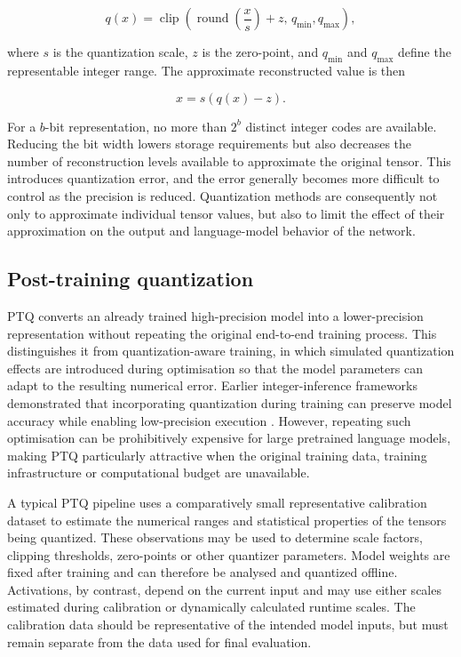 \begin{equation}
q(x)
=
\operatorname{clip}
\left(
\operatorname{round}
\left(
\frac{x}{s}
\right)
+z,\,
q_{\min},q_{\max}
\right),
\label{eq:uniform-quantization}
\end{equation}

where \(s\) is the quantization scale, \(z\) is the zero-point, and \(q_{\min}\) and \(q_{\max}\) define the representable integer range. The approximate reconstructed value is then

\begin{equation}
\hat{x}
=
s\left(q(x)-z\right).
\label{eq:uniform-dequantization}
\end{equation}

For a \(b\)-bit representation, no more than \(2^b\) distinct integer codes are available. Reducing the bit width lowers storage requirements but also decreases the number of reconstruction levels available to approximate the original tensor. This introduces quantization error, and the error generally becomes more difficult to control as the precision is reduced. Quantization methods are consequently not only to approximate individual tensor values, but also to limit the effect of their approximation on the output and language-model behavior of the network.


\subsection{Post-training quantization}
\ac{PTQ} converts an already trained high-precision model into a
lower-precision representation without repeating the original
end-to-end training process. This distinguishes it from
quantization-aware training, in which simulated quantization effects
are introduced during optimisation so that the model parameters can
adapt to the resulting numerical error. Earlier integer-inference
frameworks demonstrated that incorporating quantization during training
can preserve model accuracy while enabling low-precision execution
\cite{jacob2017quantizationtrainingneuralnetworks}. However, repeating
such optimisation can be prohibitively expensive for large pretrained
language models, making \ac{PTQ} particularly attractive when the
original training data, training infrastructure or computational budget
are unavailable.

A typical \ac{PTQ} pipeline uses a comparatively small representative
calibration dataset to estimate the numerical ranges and statistical
properties of the tensors being quantized. These observations may be
used to determine scale factors, clipping thresholds, zero-points or
other quantizer parameters. Model weights are fixed after training and
can therefore be analysed and quantized offline. Activations, by
contrast, depend on the current input and may use either scales
estimated during calibration or dynamically calculated runtime scales.
The calibration data should be representative of the intended model
inputs, but must remain separate from the data used for final
evaluation.

